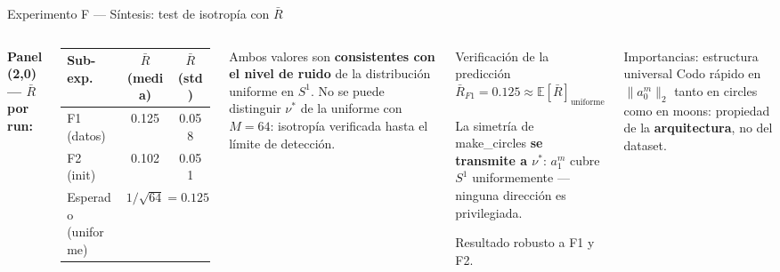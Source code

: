 \documentclass[10pt]{beamer}
\begin{document}
\begin{frame}{Experimento F — Síntesis: test de isotropía con $\bar{R}$}
\small
\begin{columns}

\textbf{Panel (2,0) — $\bar{R}$ por run:}

\begin{tabular}{lcc}
  \toprule
  Sub-exp. & $\bar{R}$ (media) & $\bar{R}$ (std) \\
  \midrule
  F1 (datos) & 0.125 & 0.058 \\
  F2 (init)  & 0.102 & 0.051 \\
  \midrule
  Esperado (uniforme) & \multicolumn{2}{c}{$1/\sqrt{64} = 0.125$} \\
  \bottomrule
\end{tabular}

\smallskip
Ambos valores son \textbf{consistentes con el nivel de ruido} de la distribución uniforme en $S^1$. No se puede distinguir $\nu^*$ de la uniforme con $M=64$: isotropía verificada hasta el límite de detección.

\begin{alertblock}{Verificación de la predicción}
  $\bar{R}_{F1} = 0.125 \approx \mathbb{E}[\bar{R}]_{\text{uniforme}}$

  \smallskip
  La simetría de make\_circles \textbf{se transmite a $\nu^*$}: $a_1^m$ cubre $S^1$ uniformemente — ninguna dirección es privilegiada.

  \smallskip
  Resultado robusto a F1 y F2.
\end{alertblock}

\smallskip
\begin{block}{Importancias: estructura universal}
  Codo rápido en $\|a_0^m\|_2$ tanto en circles como en moons: propiedad de la \textbf{arquitectura}, no del dataset.
\end{block}
\end{columns}

\end{frame}
\end{document}
